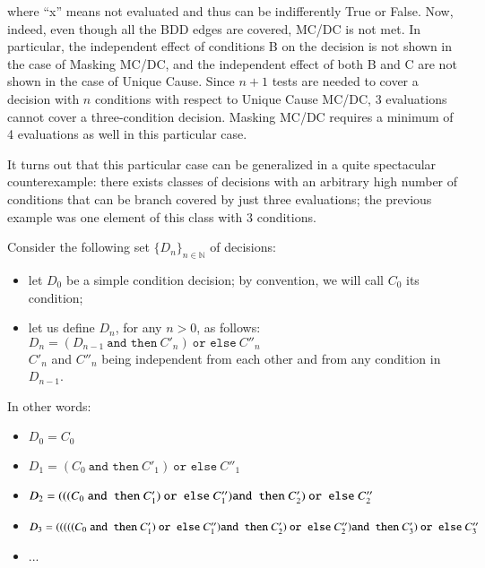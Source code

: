 \documentclass[a4paper,12pt,twoside]{article}
\newcommand{\N}{\mathbb{N}}
\newcommand{\andthen}{\texttt{and then}}
\newcommand{\orelse}{\texttt{or else}}
\begin{document}
where ``x'' means not evaluated and thus can be indifferently True or False.
%
Now, indeed, even though all the BDD edges are covered, MC/DC is not
met. In particular, the independent effect of conditions B on the
decision is not shown in the case of Masking MC/DC, and the
independent effect of both B and C are not shown in the case of Unique
Cause.  Since $n+1$ tests are needed to cover a decision with $n$
conditions with respect to Unique Cause MC/DC, 3 evaluations cannot cover a
three-condition decision. Masking MC/DC requires a minimum of 4 evaluations
as well in this particular case.

It turns out that this particular case can be generalized in a
quite spectacular counterexample: there exists classes of decisions
with an arbitrary high number of conditions that can be branch covered
by just three evaluations; the previous example was one element of this
class with 3 conditions.

Consider the following set $\{D_{n}\}_{n \in \N}$  of decisions:

\begin{itemize}
\item let $D_{0}$ be a simple condition decision; by convention,
      we will call $C_{0}$ its condition;
\item let us define $D_{n}$, for any $n>0$, as follows:\\
      $D_{n} = (D_{n-1} \ \andthen{} \ C'_{n}) \ \orelse{} \ C''_{n}$\\
      $C'_{n}$ and $C''_{n}$ being independent from each other and from
      any condition in $D_{n-1}$.
\end{itemize}

In other words:
\begin{itemize}
\item $D_{0} = C_{0}$
\item $D_{1} = (C_{0} \ \andthen{} \ C'_{1}) \ \orelse{} \ C''_{1}$
\item $D_{2} = (((C_{0} \ \andthen{} \ C'_{1}) \ \orelse{} \ C''_{1})\\
                 \andthen{} \ C'_{2}) \ \orelse{} \ C''_{2}$
\item $D_{3} = (((((C_{0} \ \andthen{} \ C'_{1}) \ \orelse{} \ C''_{1})\\
                 \andthen{} \ C'_{2}) \ \orelse{} \ C''_{2})\\
                   \andthen{} \ C'_{3}) \ \orelse{} \ C''_{3}$
\item ...
\end{itemize}
\end{document}
